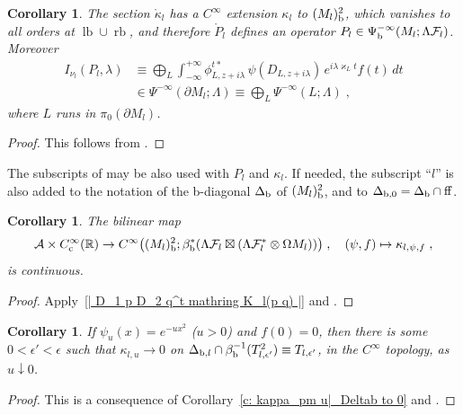 \documentclass{memo-l}
\theoremstyle{plain}
\newtheorem{cor}[thm]{Corollary}
\theoremstyle{definition}
\theoremstyle{remark}
\newcommand{\R}{\mathbb{R}}
\renewcommand{\AA}{\mathcal{A}}
\newcommand{\FF}{\mathcal{F}}
\newcommand{\lb}{\operatorname{lb}}
\newcommand{\rb}{\operatorname{rb}}
\newcommand{\ff}{\operatorname{ff}}
\newcommand{\Psib}{\Psi_{\text{\rm b}}}
\newcommand{\Deltab}{\Delta_{\text{\rm b}}}
\newcommand{\Cinftyc}{C^\infty_{\text{\rm c}}}
\numberwithin{section}{chapter}
\numberwithin{equation}{section}%
\begin{document}
\begin{cor}\label{c: P_l u in Psib^-infty(M_l bigwedge T^*FF_l)}
The section $\mathring\kappa_l$ has a $C^\infty$ extension $\kappa_l$ to $(M_l)^2_{\text{\rm b}}$, which vanishes to all orders at $\lb\cup\rb$, and therefore $\mathring P_l$ defines an operator $P_l\in\Psib^{-\infty}(M_l;\Lambda\FF_l)$. Moreover
\begin{align*}
I_{\nu_l}(P_l,\lambda)
&\equiv\bigoplus_L\int_{-\infty}^{+\infty}\phi_{L,z+i\lambda}^{t*}\,\psi(D_{L,z+i\lambda})\,e^{i\lambda\varkappa_Lt}f(t)\,dt\\
&\in\Psi^{-\infty}(\partial M_l;\Lambda)\equiv\bigoplus_L\Psi^{-\infty}(L;\Lambda)\;,
\end{align*}
where $L$ runs in $\pi_0(\partial M_l)$.
\end{cor}

\begin{proof}
This follows from .
\end{proof}

The subscripts of  may be also used with $P_l$ and $\kappa_l$. If needed, the subscript ``$l$'' is also added to the notation of the b-diagonal $\Deltab$ of $(M_l)^2_{\text{\rm b}}$, and to $\Delta_{\text{\rm b},0}=\Deltab\cap\ff$.

\begin{cor}\label{c: (psi f) mapsto kappa_l psi f is cont}
The bilinear map
\[
\AA\times\Cinftyc(\R)\to C^\infty\big((M_l)^2_{\text{\rm b}};\beta_{\text{\rm b}}^*(\Lambda\FF_l \boxtimes (\Lambda\FF^*_l\otimes \Omega M_l))\big)\;,\quad(\psi,f)\mapsto\kappa_{l,\psi,f}\;,
\]
is continuous.
\end{cor}

\begin{proof}
Apply~\eqref{| D_1 p D_2 q^t mathring K_l(p q) |} and .
\end{proof}

\begin{cor}\label{c: kappa_l u to 0  on Deltab cap beta_b^-1(T_l epsilon'^2)}
If $\psi_u(x)=e^{-ux^2}$ {\rm(}$u>0${\rm)} and $f(0)=0$, then there is some $0<\epsilon'<\epsilon$ such that $\kappa_{l,u}\to0$ on $\Delta_{\text{\rm b},l}\cap\beta_{\text{\rm b}}^{-1}(T_{l,\epsilon'}^2)\equiv T_{l,\epsilon'}$, in the $C^\infty$ topology, as $u\downarrow0$.
\end{cor}

\begin{proof}
This is a consequence of Corollary~\ref{c: kappa_pm u|_Deltab to 0} and .
\end{proof}
\end{document}
